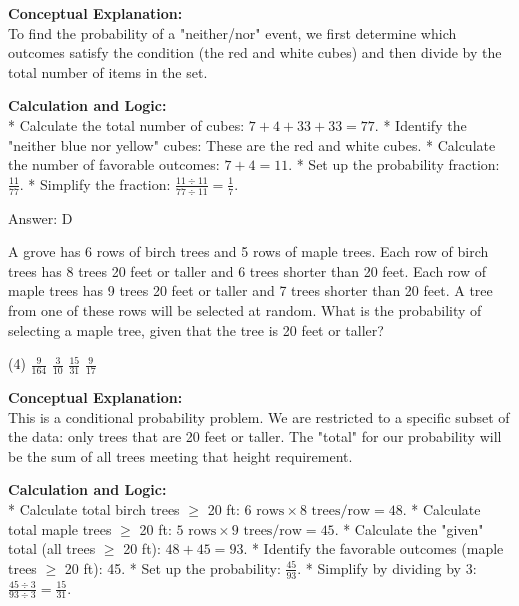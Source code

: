 \documentclass[11pt,paper=a4,answers]{exam}
\begin{document}
\begin{questions}
\begin{solution}
\textbf{Conceptual Explanation:} \\
To find the probability of a "neither/nor" event, we first determine which outcomes satisfy the condition (the red and white cubes) and then divide by the total number of items in the set.

\vspace{30pt}

\textbf{Calculation and Logic:} \\
* Calculate the total number of cubes: $7 + 4 + 33 + 33 = 77$.
* Identify the "neither blue nor yellow" cubes: These are the red and white cubes.
* Calculate the number of favorable outcomes: $7 + 4 = 11$.
* Set up the probability fraction: $\frac{11}{77}$.
* Simplify the fraction: $\frac{11 \div 11}{77 \div 11} = \frac{1}{7}$.

\vspace{30pt}

Answer: \colorbox{yellow!100}{D}
\end{solution}

\vspace{60pt}

\question
A grove has 6 rows of birch trees and 5 rows of maple trees. Each row of birch trees has 8 trees 20 feet or taller and 6 trees shorter than 20 feet. Each row of maple trees has 9 trees 20 feet or taller and 7 trees shorter than 20 feet. A tree from one of these rows will be selected at random. What is the probability of selecting a maple tree, given that the tree is 20 feet or taller?
\begin{tasks}(4)
    \task $\frac{9}{164}$
    \task $\frac{3}{10}$
    \task $\frac{15}{31}$
    \task $\frac{9}{17}$
\end{tasks}

\begin{solution}
\textbf{Conceptual Explanation:} \\
This is a conditional probability problem. We are restricted to a specific subset of the data: only trees that are 20 feet or taller. The "total" for our probability will be the sum of all trees meeting that height requirement.

\vspace{30pt}

\textbf{Calculation and Logic:} \\
* Calculate total birch trees $\ge$ 20 ft: $6 \text{ rows} \times 8 \text{ trees/row} = 48$.
* Calculate total maple trees $\ge$ 20 ft: $5 \text{ rows} \times 9 \text{ trees/row} = 45$.
* Calculate the "given" total (all trees $\ge$ 20 ft): $48 + 45 = 93$.
* Identify the favorable outcomes (maple trees $\ge$ 20 ft): 45.
* Set up the probability: $\frac{45}{93}$.
* Simplify by dividing by 3: $\frac{45 \div 3}{93 \div 3} = \frac{15}{31}$.


\end{solution}
\end{questions}
\end{document}
